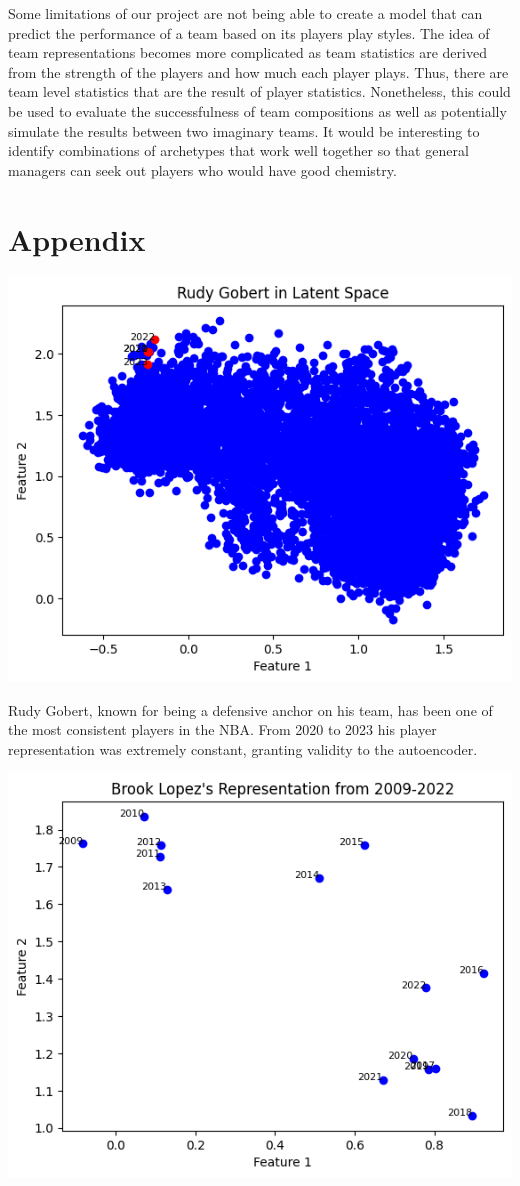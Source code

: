 \documentclass[12pt, letterpaper, titlepage]{article}
\begin{document}
Some limitations of our project are not being able to create a model that can predict the performance of a team based on its players play styles. The idea of team representations becomes more complicated as team statistics are derived from the strength of the players and how much each player plays.  Thus, there are team level statistics that are the result of player statistics.  Nonetheless, this could be used to evaluate the successfulness of team compositions as well as potentially simulate the results between two imaginary teams.  It would be interesting to identify combinations of archetypes that work well together so that general managers can seek out players who would have good chemistry.



\section{Appendix}

\includegraphics{Gobert}

Rudy Gobert, known for being a defensive anchor on his team, has been one of the most consistent players in the NBA.  From 2020 to 2023 his player representation was extremely constant, granting validity to the autoencoder.

\includegraphics{Lopez}
\end{document}
